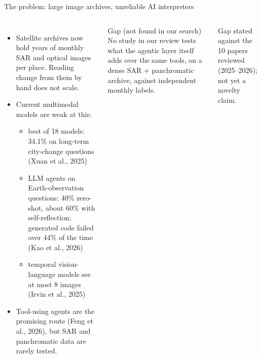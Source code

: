 \documentclass[aspectratio=169,11pt]{beamer}
\begin{document}
\begin{frame}[shrink=22]{The problem: large image archives, unreliable AI interpreters}
\begin{columns}[T,onlytextwidth]
\begin{itemize}
  \item Satellite archives now hold years of monthly SAR and optical images per place. Reading change from them by hand does not scale.
  \item Current multimodal models are weak at this:
  \begin{itemize}
    \item best of 18 models: 34.1\% on long-term city-change questions (Xuan et al., 2025)
    \item LLM agents on Earth-observation questions: 40\% zero-shot, about 60\% with self-reflection; generated code failed over 44\% of the time (Kao et al., 2026)
    \item temporal vision-language models see at most 8 images (Irvin et al., 2025)
  \end{itemize}
  \item Tool-using agents are the promising route (Feng et al., 2026), but SAR and panchromatic data are rarely tested.
\end{itemize}
\begin{block}{Gap (not found in our search)}
\small No study in our review tests what the \alert{agentic layer itself} adds over the same tools, on a dense SAR + panchromatic archive, against independent monthly labels.
\end{block}
\vspace{4pt}
{\footnotesize\color{muted} Gap stated against the 10 papers reviewed (2025--2026); not yet a novelty claim.}
\end{columns}
\end{frame}
\end{document}
